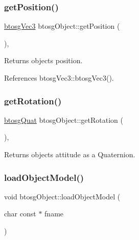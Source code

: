 \subsubsection{\texorpdfstring{get\+Position()}{getPosition()}}
{\footnotesize\ttfamily \hyperlink{classbtosgVec3}{btosg\+Vec3} btosg\+Object\+::get\+Position (\begin{DoxyParamCaption}{ }\end{DoxyParamCaption})\hspace{0.3cm}{\ttfamily [inline]}, {\ttfamily [inherited]}}

Returns object\textquotesingle{}s position. 

References btosg\+Vec3\+::btosg\+Vec3().

\mbox{\label{classbtosgObject_a3b825999ad3a51bde743d4085ff19dae}} 
\subsubsection{\texorpdfstring{get\+Rotation()}{getRotation()}}
{\footnotesize\ttfamily \hyperlink{classbtosgQuat}{btosg\+Quat} btosg\+Object\+::get\+Rotation (\begin{DoxyParamCaption}{ }\end{DoxyParamCaption})\hspace{0.3cm}{\ttfamily [inline]}, {\ttfamily [inherited]}}

Returns object\textquotesingle{}s attitude as a Quaternion. \mbox{\label{classbtosgObject_a91838b8235579da178fcc06e6d3d47f3}} 
\subsubsection{\texorpdfstring{load\+Object\+Model()}{loadObjectModel()}}
{\footnotesize\ttfamily void btosg\+Object\+::load\+Object\+Model (\begin{DoxyParamCaption}\item[{char const $\ast$}]{fname }\end{DoxyParamCaption})\hspace{0.3cm}{\ttfamily [inherited]}}

